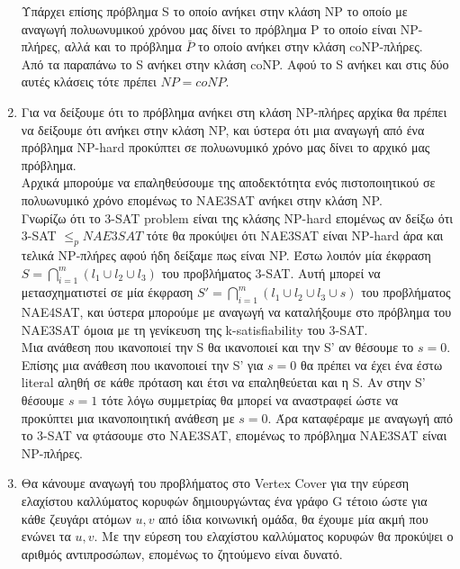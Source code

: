 \documentclass{article}
\begin{document}
\begin{enumerate}
Υπάρχει επίσης πρόβλημα S το οποίο ανήκει στην κλάση NP το οποίο με αναγωγή πολυωνυμικού χρόνου μας 
δίνει το πρόβλημα P το οποίο είναι NP-πλήρες, αλλά και το πρόβλημα $\bar{P}$ το οποίο ανήκει στην κλάση
coNP-πλήρες.\\

Από τα παραπάνω το S ανήκει στην κλάση coNP. Αφού το S ανήκει και στις δύο αυτές κλάσεις τότε πρέπει 
$NP = coNP$.\\

\pagebreak
    \item{}
Για να δείξουμε ότι το πρόβλημα ανήκει στη κλάση NP-πλήρες αρχίκα θα πρέπει να δείξουμε ότι ανήκει στην
κλάση NP, και ύστερα ότι μια αναγωγή από ένα πρόβλημα NP-hard προκύπτει σε πολυωνυμικό χρόνο μας δίνει 
το αρχικό μας πρόβλημα.\\

Αρχικά μπορούμε να επαληθεύσουμε της αποδεκτότητα ενός πιστοποιητικού σε πολυωνυμικό χρόνο επομένως το NAE3SAT ανήκει στην κλάση NP.\\

Γνωρίζω ότι το 3-SAT problem είναι της κλάσης NP-hard επομένως αν δείξω ότι 3-SAT $\le_p NAE3SAT$ τότε 
θα προκύψει ότι NAE3SAT είναι NP-hard άρα και τελικά NP-πλήρες αφού ήδη δείξαμε πως είναι NP. Έστω λοιπόν 
μία έκφραση $S = \bigcap_{i=1}^{m}(l_1\cup l_2 \cup l_3)$ του προβλήματος 3-SAT. Αυτή μπορεί να 
μετασχηματιστεί σε μία έκφραση $S' = \bigcap_{i=1}^{m}(l_1 \cup l_2 \cup l_3 \cup s)$ του προβλήματος 
NAE4SAT, και ύστερα μπορούμε με αναγωγή να καταλήξουμε στο πρόβλημα του NAE3SAT όμοια με τη γενίκευση
της k-satisfiability του 3-SAT.\\

Μια ανάθεση που ικανοποιεί την S θα ικανοποιεί και την S' αν θέσουμε το $s=0$. Επίσης μια ανάθεση 
που ικανοποιεί την S' για $s=0$ θα πρέπει να έχει ένα έστω literal αληθή σε κάθε πρόταση και έτσι να
επαληθεύεται και η S. Αν στην S' θέσουμε $s=1$ τότε λόγω συμμετρίας θα μπορεί να αναστραφεί ώστε 
να προκύπτει μια ικανοποιητική ανάθεση με $s=0$. Άρα καταφέραμε με αναγωγή από το 3-SAT να φτάσουμε 
στο NAE3SAT, επομένως το πρόβλημα NAE3SAT είναι NP-πλήρες.\\

    \item{}
Θα κάνουμε αναγωγή του προβλήματος στο Vertex Cover για την εύρεση ελαχίστου καλλύματος κορυφών δημιουργώντας
ένα γράφο G τέτοιο ώστε για κάθε ζευγάρι ατόμων $u,v$ από ίδια κοινωνική ομάδα, θα έχουμε μία ακμή που ενώνει 
τα  $u,v$. Με την εύρεση του ελαχίστου καλλύματος κορυφών θα προκύψει ο αριθμός αντιπροσώπων, επομένως 
το ζητούμενο είναι δυνατό.\\
\end{enumerate}
\end{document}
